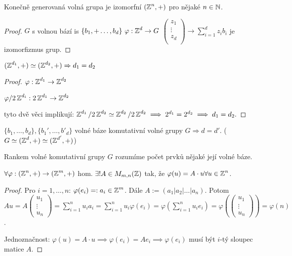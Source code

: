 \begin{claim}
Konečně generovaná volná grupa je izomorfní $(\operatorname{\mathbb{Z}}^n,+)$ pro nějaké $n\in\operatorname{\mathbb{N}}$.
\end{claim}
\begin{proof}
$G$ s volnou bází is $\{b_1,+\ldots,b_d\}\ \varphi:\Z^d\rightarrow G$ $\begin{pmatrix}
z_1 \\
\vdots \\
z_d \\
\end{pmatrix}
\rightarrow \sum_{i=1}^d z_i b_i$ je izomorfizmus grup.
\end{proof}


\begin{claim}
$(\operatorname{\mathbb{Z}}^{d_1}, +) \simeq (\operatorname{\mathbb{Z}}^{d_2}, +) \Rightarrow d_1 = d_2$
\end{claim}

\begin{proof}
$\varphi: \operatorname{\mathbb{Z}}^{d_1} \rightarrow \operatorname{\mathbb{Z}}^{d_2} $

$\varphi/2\operatorname{\mathbb{Z}}^{d_i}: 2\operatorname{\mathbb{Z}}^{d_1} \rightarrow \operatorname{\mathbb{Z}}^{d_2}$



tyto dvě věci implikují: $\operatorname{\mathbb{Z}}^{d_1}/2\operatorname{\mathbb{Z}}^{d_2}\simeq \operatorname{\mathbb{Z}}^{d_2}/2\operatorname{\mathbb{Z}}^{d_2}\implies 2^{d_1}=2^{d_2}\implies d_1=d_2.$
\end{proof}

\begin{consequence}
$\{b_1, \dots, b_d\}, \{b_1', \dots, b'_d\}$ volné báze komutativní volné grupy $G \Rightarrow d = d'$. ($G \simeq (\operatorname{\mathbb{Z}}^d, +) \simeq (\operatorname{\mathbb{Z}}^{d'}, +)$)
\end{consequence}

\begin{definition}
Rankem volné komutativní grupy $G$ rozumíme počet prvků nějaké její volné báze.
\end{definition}

\begin{claim}
$\forall\varphi: (\operatorname{\mathbb{Z}}^n, +) \rightarrow (\operatorname{\mathbb{Z}}^m, +)$ hom. $\exists ! A\in M_{m,n}(\operatorname{\mathbb{Z}})$ tak, že $\varphi(u)=A\cdot u \forall u\in\operatorname{\mathbb{Z}}^n$.
\end{claim}

\begin{proof}
Pro $i = 1, \dots , n$: $\varphi(e_i) =: a_i \in \operatorname{\mathbb{Z}}^m$. Dále $A:= (a_1|a_2|\dots|a_n)$. Potom $Au = A \begin{pmatrix}
u_1 \\
\vdots \\
u_n
\end{pmatrix}
=\sum_{i=1}^n u_i a_i=\sum_{i=1}^n u_i \varphi(e_i)
= \varphi(\sum_{i=1}^nu_ie_i) = \varphi(\begin{pmatrix}
u_1 \\
\vdots \\
u_n
\end{pmatrix}) = \varphi(n)$.

Jednoznačnost: $\varphi(u)=A\cdot u\implies \varphi(e_i)=A e_i\implies \varphi(e_i)$ musí být $i$-tý sloupec matice $A$. 
\end{proof}

